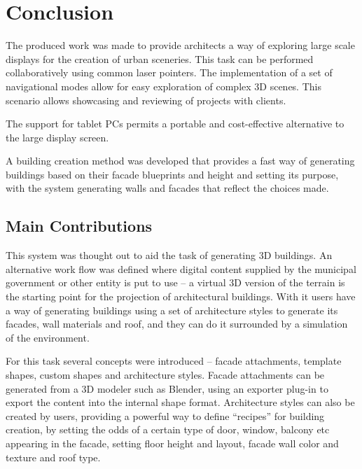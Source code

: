 \chapter{Conclusion}



The produced work was made to provide architects a way
of exploring large scale displays for the creation of urban sceneries.
This task can be performed collaboratively using common laser pointers.
The implementation of a set of navigational modes allow for easy
exploration of complex 3D scenes.
This scenario allows showcasing and reviewing of projects with clients.

The support for tablet PCs permits a portable and cost-effective alternative
to the large display screen.

A building creation method was developed that provides a fast way
of generating buildings based on their facade blueprints and height and
setting its purpose, with the system generating walls and facades that
reflect the choices made.



\section{Main Contributions}

This system was thought out to aid the task of generating 3D buildings.
An alternative work flow was defined where digital content supplied by
the municipal government or other entity is put to use -- a virtual 3D
version of the terrain is the starting point for the projection of
architectural buildings.
With it users have a way of generating buildings using a set of
architecture styles to generate its facades, wall materials and roof,
and they can do it surrounded by a simulation of the environment.

For this task several concepts were introduced -- facade attachments,
template shapes, custom shapes and architecture styles.
Facade attachments can be generated from a 3D modeler such as Blender,
using an exporter plug-in to export the content into the internal shape format.
Architecture styles can also be created by users, providing a 
powerful way to define ``recipes'' for building creation, by setting the
odds of a certain type of door, window, balcony etc appearing in the facade,
setting floor height and layout, facade wall color and texture and roof type.

